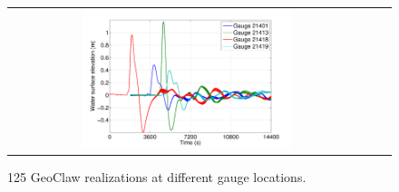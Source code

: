 \documentclass[review,12pt]{elsarticle}
\newcommand{\geoclaw}{{\sc GeoClaw}\xspace}
\begin{document}
\begin{figure}[ht]
\centering
\begin{tabular}{clc}        
\includegraphics[width=0.6\textwidth]{Figure3.pdf} 
\end{tabular}
\caption{125 \geoclaw realizations at different gauge locations.}
\label{fig:rlzs}
\end{figure}
\end{document}
